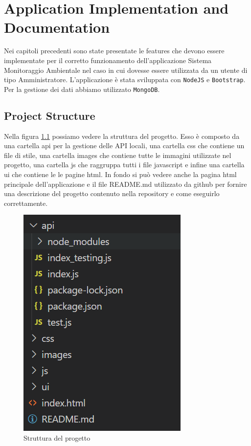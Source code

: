 \chapter{Application Implementation and \\ Documentation}

Nei capitoli precedenti sono state presentate le features che devono essere implementate per il corretto funzionamento dell'applicazione Sistema Monitoraggio Ambientale nel caso in cui dovesse essere utilizzata da un utente di tipo Amministratore.
L'applicazione è stata sviluppata con \texttt{NodeJS} e \texttt{Bootstrap}. Per la gestione dei dati abbiamo utilizzato \texttt{MongoDB}.

\section{Project Structure}

Nella figura \ref{fig:projectStructure} possiamo vedere la struttura del progetto.
Esso è composto da una cartella api per la gestione delle API locali, una cartella css che contiene un file di stile, una cartella images che contiene tutte le immagini utilizzate nel progetto, una cartella js che raggruppa tutti i file javascript e infine una cartella ui che contiene le le pagine html. In fondo si può vedere anche la pagina html principale dell'applicazione e il file README.md utilizzato da github per fornire una descrizione del progetto contenuto nella repository e come eseguirlo correttamente.

\begin{figure}[ht]
    \centering
    \includegraphics[scale=1]{Img/ProjectStructure.png}
    \caption{Struttura del progetto}
    \label{fig:projectStructure}
\end{figure}

